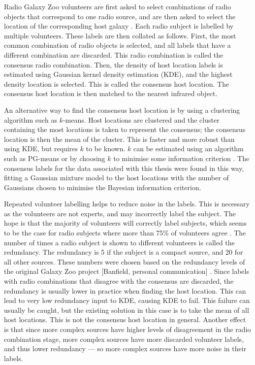     Radio Galaxy Zoo volunteers are first asked to select combinations of radio
    objects that correspond to one radio source, and are then asked to select
    the location of the corresponding host galaxy \citep{banfield15}. Each radio
    subject is labelled by multiple volunteers. These labels are then collated
    as follows. First, the most common combination of radio objects is
    selected, and all labels that have a different combination are discarded.
    This radio combination is called the consensus radio combination. Then, the
    density of host location labels is estimated using Gaussian kernel density
    estimation (KDE), and the highest density location is selected. This is
    called the consensus host location. The consensus host location is then
    matched to the nearest infrared object.

    An alternative way to find the consensus host location is by using a
    clustering algorithm such as $k$-means. Host locations are clustered and
    the cluster containing the most locations is taken to represent the
    consensus; the consensus location is then the mean of the cluster. This is
    faster and more robust than using KDE, but requires $k$ to be known. $k$
    can be estimated using an algorithm such as PG-means \citep{hamerly07} or by
    choosing $k$ to minimise some information criterion .
    The consensus labels for the data associated with this thesis were found in
    this way, fitting a Gaussian mixture model to the host locations with the
    number of Gaussians chosen to minimise the Bayesian information criterion.

    Repeated volunteer labelling helps to reduce noise in the labels. This is
    necessary as the volunteers are not experts, and may incorrectly label the
    subject. The hope is that the majority of volunteers will correctly label
    subjects, which seems to be the case for radio subjects where more than
    75\% of volunteers agree \citep{banfield15}. The number of times a radio
    subject is shown to different volunteers is called the redundancy. The
    redundancy is 5 if the subject is a compact source, and 20 for all other
    sources. These numbers were chosen based on the redundancy levels of the
    original Galaxy Zoo project [Banfield, personal communication] . Since labels with radio combinations that disagree with
    the consensus are discarded, the redundancy is usually lower in practice
    when finding the host location. This can lead to very low redundancy input
    to KDE, causing KDE to fail. This failure can usually be caught, but the
    existing solution in this case is to take the mean of all host locations.
    This is not the consensus host location in general. Another effect is that
    since more complex sources have higher levels of disagreement in the radio
    combination stage, more complex sources have more discarded volunteer
    labels, and thus lower redundancy --- so more complex sources have more
    noise in their labels.

